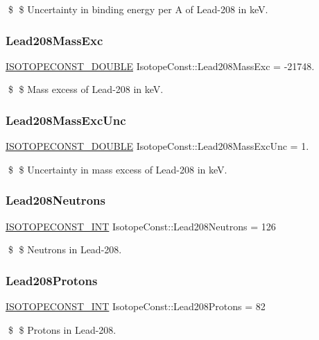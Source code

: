 \$ \$ Uncertainty in binding energy per A of Lead-\/208 in keV. \mbox{\label{group___isotope_const-_lead-_pb208_gafc03048ce168ae9a2b828546b8e78f16}} 
\subsubsection{\texorpdfstring{Lead208\+Mass\+Exc}{Lead208MassExc}}
{\footnotesize\ttfamily \mbox{\hyperlink{group___isotope_const-_macros_ga8f45a7272ce02c0b4c65c44636ed719a}{I\+S\+O\+T\+O\+P\+E\+C\+O\+N\+S\+T\+\_\+\+D\+O\+U\+B\+LE}} Isotope\+Const\+::\+Lead208\+Mass\+Exc = -\/21748.}

\$ \$ Mass excess of Lead-\/208 in keV. \mbox{\label{group___isotope_const-_lead-_pb208_ga78ad7262a529485abed5cd84271aedd9}} 
\subsubsection{\texorpdfstring{Lead208\+Mass\+Exc\+Unc}{Lead208MassExcUnc}}
{\footnotesize\ttfamily \mbox{\hyperlink{group___isotope_const-_macros_ga8f45a7272ce02c0b4c65c44636ed719a}{I\+S\+O\+T\+O\+P\+E\+C\+O\+N\+S\+T\+\_\+\+D\+O\+U\+B\+LE}} Isotope\+Const\+::\+Lead208\+Mass\+Exc\+Unc = 1.}

\$ \$ Uncertainty in mass excess of Lead-\/208 in keV. \mbox{\label{group___isotope_const-_lead-_pb208_gaacc582aa1138ba32dbe0c180a3eb56d8}} 
\subsubsection{\texorpdfstring{Lead208\+Neutrons}{Lead208Neutrons}}
{\footnotesize\ttfamily \mbox{\hyperlink{group___isotope_const-_macros_ga5f18360b3e99483a35c32d789e62621c}{I\+S\+O\+T\+O\+P\+E\+C\+O\+N\+S\+T\+\_\+\+I\+NT}} Isotope\+Const\+::\+Lead208\+Neutrons = 126}

\$ \$ Neutrons in Lead-\/208. \mbox{\label{group___isotope_const-_lead-_pb208_ga683b0f5638ee2a9a10815b38ec6228c5}} 
\subsubsection{\texorpdfstring{Lead208\+Protons}{Lead208Protons}}
{\footnotesize\ttfamily \mbox{\hyperlink{group___isotope_const-_macros_ga5f18360b3e99483a35c32d789e62621c}{I\+S\+O\+T\+O\+P\+E\+C\+O\+N\+S\+T\+\_\+\+I\+NT}} Isotope\+Const\+::\+Lead208\+Protons = 82}

\$ \$ Protons in Lead-\/208. 